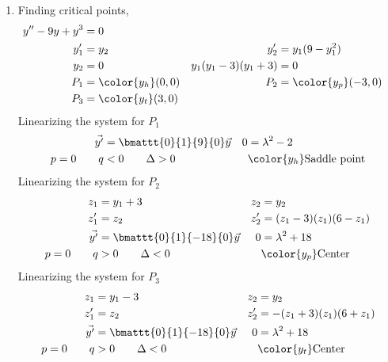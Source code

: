 \begin{enumerate}
    \item Finding critical points,
          \begin{align}
              y'' - 9y + y^{3}       & = 0                     \\
              y_1'                   & = y_2                 &
              y_2'                   & = y_1(9 - y_1^{2})      \\
              y_2                    & = 0                   &
              y_1 (y_1 - 3)(y_1 + 3) & = 0                     \\
              P_1                    & = \color{y_h}(0, 0)   &
              P_2                    & = \color{y_p} (-3, 0)   \\
              P_3                    & = \color{y_t} (3, 0)
          \end{align}
          Linearizing the system for $ P_1 $
          \begin{align}
              \vec{y'}       & = \bmattt{0}{1}{9}{0} \vec{y}   &
              0              & = \lambda^{2} - 2                 \\
              p = 0 \qquad q & < 0 \qquad \Delta > 0           &
                             & \color{y_h} \text{Saddle point}
          \end{align}
          Linearizing the system for $ P_2 $
          \begin{align}
              z_1            & = y_1 + 3                       &
              z_2            & = y_2                             \\
              z_1'           & = z_2                           &
              z_2'           & = (z_1 - 3)(z_1)(6 - z_1)         \\
              \vec{y'}       & = \bmattt{0}{1}{-18}{0} \vec{y} &
              0              & = \lambda^{2} + 18                \\
              p = 0 \qquad q & > 0 \qquad \Delta < 0           &
                             & \color{y_p} \text{Center}
          \end{align}
          Linearizing the system for $ P_3 $
          \begin{align}
              z_1            & = y_1 - 3                       &
              z_2            & = y_2                             \\
              z_1'           & = z_2                           &
              z_2'           & = -(z_1 + 3)(z_1)(6 + z_1)        \\
              \vec{y'}       & = \bmattt{0}{1}{-18}{0} \vec{y} &
              0              & = \lambda^{2} + 18                \\
              p = 0 \qquad q & > 0 \qquad \Delta < 0           &
                             & \color{y_t} \text{Center}
          \end{align}


\end{enumerate}
